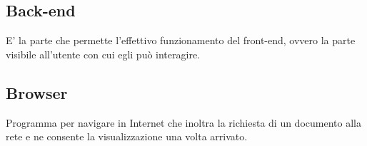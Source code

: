 \documentclass[../glossario.tex]{subfiles}
\begin{document}
\subsection*{Back-end}
E' la parte che permette l'effettivo funzionamento del front-end, ovvero la parte visibile all'utente con cui egli può interagire.

\subsection*{Browser}
Programma per navigare in Internet che inoltra la richiesta di un documento alla rete e ne consente la visualizzazione una volta arrivato.
    
\end{document}

